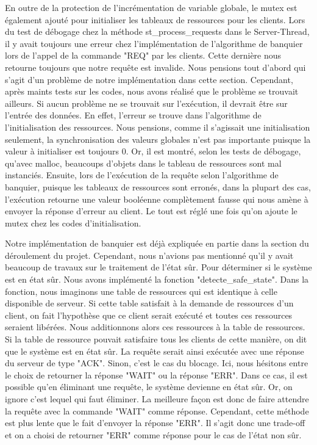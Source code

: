 \documentclass[11pt]{article}
\begin{document}
En outre de la protection de l'incrémentation de variable globale, le mutex est également ajouté pour initialiser les tableaux de ressources pour les clients. Lors du test de débogage chez la méthode st\_process\_requests dans le Server-Thread, il y avait toujours une erreur chez l'implémentation de l'algorithme de banquier lors de l'appel de la commande "REQ" par les clients. Cette dernière nous retourne toujours que notre requête est invalide.
Nous pensions tout d'abord qui s'agit d'un problème de notre implémentation dans cette section. Cependant, après maints tests sur les codes, nous avons réalisé que le problème se trouvait ailleurs. Si aucun problème ne se trouvait sur l'exécution, il devrait être sur l'entrée des données. En effet, l'erreur se trouve dans l'algorithme de l'initialisation des ressources. Nous pensions, comme il s'agissait une initialisation seulement, la synchronisation des valeurs globales n'est pas importante puisque la valeur à initialiser est toujours 0. Or, il est montré, selon les tests de débogage, qu'avec malloc, beaucoups d'objets dans le tableau de ressources sont mal instanciés. Ensuite, lors de l'exécution de la requête selon l'algorithme de banquier, puisque les tableaux de ressources sont erronés, dans la plupart des cas, l'exécution retourne une valeur booléenne complètement fausse qui nous amène à envoyer la réponse d'erreur au client. Le tout est réglé une fois qu'on ajoute le mutex chez les codes d'initialisation.


Notre implémentation de banquier est déjà expliquée en partie dans la section du déroulement du projet. Cependant, nous n'avions pas mentionné qu'il y avait beaucoup de travaux sur le traitement de l'état sûr. Pour déterminer si le système est en état sûr. Nous avons implémenté la fonction "detecte\_safe\_state". Dans la fonction, nous imaginons une table de ressources qui est identique à celle disponible de serveur. Si cette table satisfait à la demande de ressources d'un client, on fait l'hypothèse que ce client serait exécuté et toutes ces ressources seraient libérées. Nous additionnons alors ces ressources à la table de ressources. Si la table de ressource pouvait satisfaire tous les clients de cette manière, on dit que le système est en état sûr. La requête serait ainsi exécutée avec une réponse du serveur de type "ACK". Sinon, c'est le cas du blocage.  Ici, nous hésitons entre le choix de retourner la réponse "WAIT" ou la réponse "ERR". Dans ce cas, il est possible qu'en éliminant une requête, le système devienne en état sûr. Or, on ignore c'est lequel qui faut éliminer. La meilleure façon est donc de faire attendre la requête avec la commande "WAIT" comme réponse. Cependant, cette méthode est plus lente que le fait d'envoyer la réponse "ERR". Il s'agit donc une trade-off et on a choisi de retourner "ERR" comme réponse pour le cas de l'état non sûr. 
\end{document}
